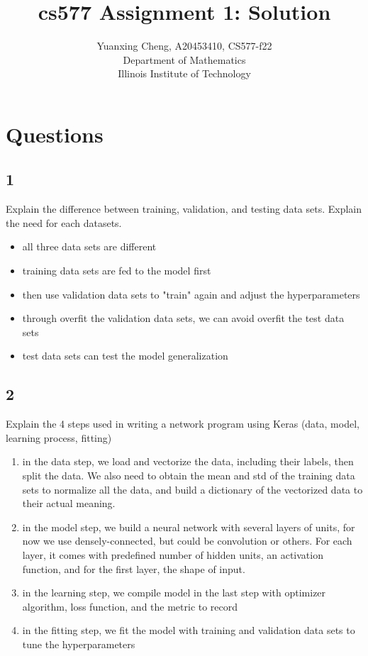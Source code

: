 \documentclass{article}
\title{cs577 Assignment 1: Solution}
\author{Yuanxing Cheng, A20453410, CS577-f22\\ Department of Mathematics \\Illinois Institute of Technology}
\begin{document}
\maketitle

\section*{Questions}

\subsection*{1}
\begin{myleftlinebox}
    Explain the difference between training, validation, and testing data sets. Explain the need for each datasets.
    \tcblower
    \begin{itemize}
        \item all three data sets are different
        \item training data sets are fed to the model first
        \item then use validation data sets to "train" again and adjust the hyperparameters
        \item through overfit the validation data sets, we can avoid overfit the test data sets
        \item test data sets can test the model generalization
    \end{itemize}
\end{myleftlinebox}

\subsection*{2}
\begin{myleftlinebox}
    Explain the 4 steps used in writing a network program using Keras (data, model, learning process, fitting)
    \tcblower
    \begin{enumerate}
        \item in the data step, we load and vectorize the data, including their labels, then split the data. We also need to obtain the mean and std of the training data sets to normalize all the data, and build a dictionary of the vectorized data to their actual meaning. 
        \item in the model step, we build a neural network with several layers of units, for now we use densely-connected, but could be convolution or others. For each layer, it comes with predefined number of hidden units, an activation function, and for the first layer, the shape of input.
        \item in the learning step, we compile model in the last step with optimizer algorithm, loss function, and the metric to record
        \item in the fitting step, we fit the model with training and validation data sets to tune the hyperparameters
    \end{enumerate}
\end{myleftlinebox}
\end{document}
